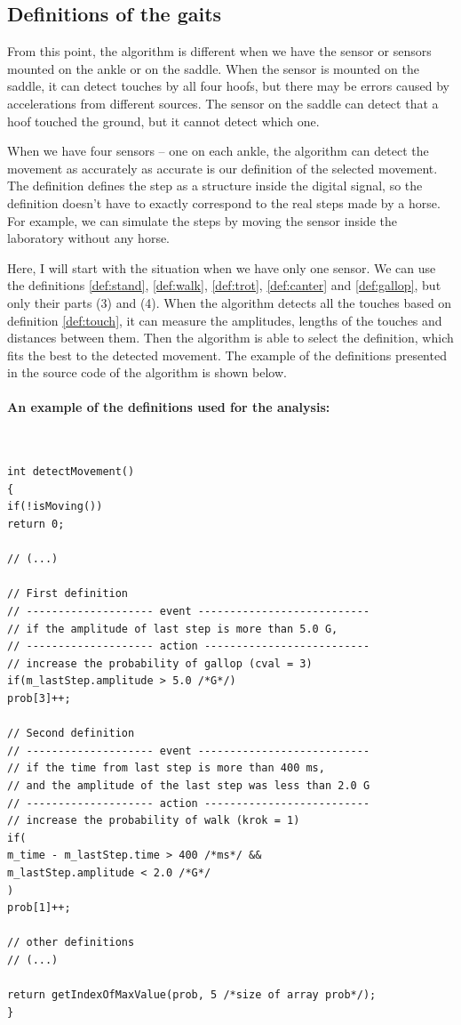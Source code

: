 \subsection{Definitions of the gaits}
From this point, the algorithm is different when we have the sensor or sensors mounted on the ankle or on the saddle. When the sensor is mounted on the saddle, it can detect touches by all four hoofs, but there may be errors caused by accelerations from different sources. The sensor on the saddle can detect that a hoof touched the ground, but it cannot detect which one.

When we have four sensors -- one on each ankle, the algorithm can detect the movement as accurately as accurate is our definition of the selected movement. The definition defines the step as a structure inside the digital signal, so the definition doesn't have to exactly correspond to the real steps made by a horse. For example, we can simulate the steps by moving the sensor inside the laboratory without any horse.

Here, I will start with the situation when we have only one sensor. We can use the definitions \ref{def:stand}, \ref{def:walk}, \ref{def:trot}, \ref{def:canter} and \ref{def:gallop}, but only their parts (3) and (4). When the algorithm detects all the touches based on definition \ref{def:touch}, it can measure the amplitudes, lengths of the touches and distances between them. Then the algorithm is able to select the definition, which fits the best to the detected movement. The example of the definitions presented in the source code of the algorithm is shown below.

\paragraph{An example of the definitions used for the analysis:} \quad\\
\Cpp
\begin{lstlisting}
int detectMovement()
{
if(!isMoving())
return 0;

// (...)

// First definition
// -------------------- event ---------------------------
// if the amplitude of last step is more than 5.0 G,
// -------------------- action --------------------------
// increase the probability of gallop (cval = 3)
if(m_lastStep.amplitude > 5.0 /*G*/)
prob[3]++;

// Second definition
// -------------------- event ---------------------------
// if the time from last step is more than 400 ms,
// and the amplitude of the last step was less than 2.0 G
// -------------------- action --------------------------
// increase the probability of walk (krok = 1)
if(
m_time - m_lastStep.time > 400 /*ms*/ &&
m_lastStep.amplitude < 2.0 /*G*/
)
prob[1]++;

// other definitions
// (...)

return getIndexOfMaxValue(prob, 5 /*size of array prob*/);
}
\end{lstlisting}

